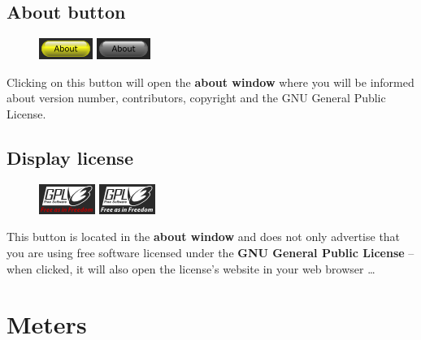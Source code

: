 \section{About button}

\begin{figure}
  \includegraphics[scale=\screenshotscale,clip]{include/images/button_about_on.png}
  \newline \vspace{-0.9\baselineskip}
  \includegraphics[scale=\screenshotscale,clip]{include/images/button_about_off.png}
\end{figure}

Clicking on this button will open the \textbf{about window} where you
will be informed about version number, contributors, copyright and the
GNU General Public License.

\newpage %

\section{Display license}

\begin{figure}
  \includegraphics[scale=\screenshotscale,clip]{include/images/button_gpl_on.png}
  \newline \vspace{-0.9\baselineskip}
  \includegraphics[scale=\screenshotscale,clip]{include/images/button_gpl_off.png}
\end{figure}

This button is located in the \textbf{about window} and does not only
advertise that you are using free software licensed under the
\textbf{GNU General Public License} -- when clicked, it will also open
the license's website in your web browser \dots

\chapter{Meters}
\label{chap:meters}

